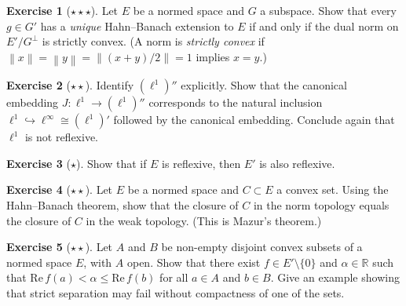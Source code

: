 \documentclass[a4paper,12pt]{book}
\newcommand{\R}{\mathbb{R}}
\newcommand{\norm}[1]{\left\| #1 \right\|}
\theoremstyle{definition}
\newtheorem{exercise}{Exercise}[chapter]
\theoremstyle{plain}
\theoremstyle{remark}
\begin{document}
\begin{exercise}[$\star\star\star$]\label{exo:hahn-banach-uniqueness}
Let $E$ be a normed space and $G$ a subspace. Show that every $g\in G'$
has a \emph{unique} Hahn--Banach extension to $E$ if and only if the dual
norm on $E'/G^\perp$ is strictly convex. (A norm is \emph{strictly convex}
 if $\norm{x}=\norm{y}=\norm{(x+y)/2}=1$
implies $x=y$.)
\end{exercise}

\begin{exercise}[$\star\star$]\label{exo:bidual-l1}
Identify $(\ell^1)''$ explicitly. Show that the canonical embedding
$J\colon\ell^1\to(\ell^1)''$ corresponds to the natural inclusion
$\ell^1\hookrightarrow\ell^\infty\cong(\ell^1)'$ followed by the canonical
embedding. Conclude again that $\ell^1$ is not reflexive.
\end{exercise}

\begin{exercise}[$\star$]\label{exo:reflexive-dual}
Show that if $E$ is reflexive, then $E'$ is also reflexive.
\end{exercise}

\begin{exercise}[$\star\star$]\label{exo:mazur-separation}
Let $E$ be a normed space and $C\subset E$ a convex set. Using the Hahn--Banach
theorem, show that the closure of $C$ in the norm topology equals the closure
of $C$ in the weak topology. (This is Mazur's theorem.)
\end{exercise}

\begin{exercise}[$\star\star$]\label{exo:separation-two-convex}
Let $A$ and $B$ be non-empty disjoint convex subsets of a normed space $E$,
with $A$ open. Show that there exist $f\in E'\setminus\{0\}$ and $\alpha\in\R$
such that $\mathrm{Re}\,f(a)<\alpha\leq\mathrm{Re}\,f(b)$ for all $a\in A$
and $b\in B$. Give an example showing that strict separation may fail without
compactness of one of the sets.
\end{exercise}
\end{document}
